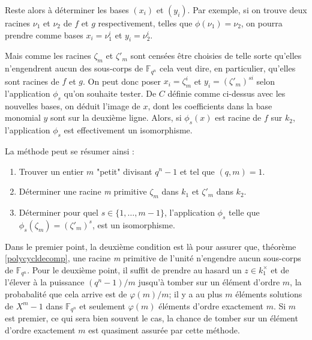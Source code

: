 \documentclass[a4paper]{article} %
\numberwithin{section}{part}
\numberwithin{equation}{section}
\newcommand\nroot[1]{\textit{#1}\up{\textit{ième}}}
\newcommand\GF[1]{\mathbb{F}_{#1}}
\begin{document}
Reste alors à déterminer les bases $(x_i)$ et $(y_i)$. Par exemple, si on trouve
deux racines $\nu_1$ et $\nu_2$ de $f$ et $g$ respectivement, telles que 
$\phi(\nu_1) = \nu_2$, on pourra prendre comme bases $x_i = \nu_1^i$ et 
$y_i = \nu_2^i$.\par
Mais comme les racines $\zeta_m$ et $\zeta'_m$ sont censées être choisies de 
telle sorte qu'elles n'engendrent aucun des sous-corps de $\GF{q^n}$ cela veut 
dire, en particulier, qu'elles sont racines de $f$ et $g$. On peut donc poser 
$x_i = \zeta_m^i$ et $y_i = (\zeta'_m)^{si}$ selon l'application $\phi_s$ qu'on 
souhaite tester. De $C$ définie comme ci-dessus avec les nouvelles bases,
on déduit l'image de $x$, dont les coefficients dans la base monomial $y$ sont 
sur la deuxième ligne. Alors, si $\phi_s(x)$ est racine de $f$ sur $k_2$,
l'application $\phi_s$ est effectivement un isomorphisme.\par
\vspace{0.3cm}
La méthode peut se résumer ainsi :
\vspace{0.3cm}
\begin{enumerate}[1.]
\item Trouver un entier $m$ "petit" divisant $q^n - 1$ et tel que 
$(q,m) = 1$. 

\item Déterminer une racine \nroot{m} primitive $\zeta_m$ dans $k_1$ et
$\zeta'_m$ dans $k_2$.

\item  Déterminer pour quel $s\in \lbrace{1,\dots,m-1}\rbrace$, l'application
$\phi_s$ telle que $\phi_s(\zeta_m) = (\zeta'_m)^s$, est un isomorphisme.
\end{enumerate}
\vspace{0.3cm}
Dans le premier point, la deuxième condition est là pour assurer que, théorème
\ref{polycycldecomp}, une racine \nroot{m} primitive de l'unité 
n'engendre aucun sous-corps de $\GF{q^n}$. Pour le deuxième point, il suffit de 
prendre au hasard un $z\in k_1^{\times}$ et de l'élever à la puissance 
$(q^n - 1)/m$ jusqu'à tomber sur un élément d'ordre $m$, la probabalité 
que cela arrive est de $\varphi(m)/m$; il y a au plus $m$ éléments solutions de
$X^m - 1$ dans $\GF{q^n}$ et seulement $\varphi(m)$ éléments d'ordre exactement
$m$. Si $m$ est premier, ce qui sera bien souvent le cas, la chance de tomber
sur un élément d'ordre exactement $m$ est quasiment assurée par cette méthode.
\end{document}
